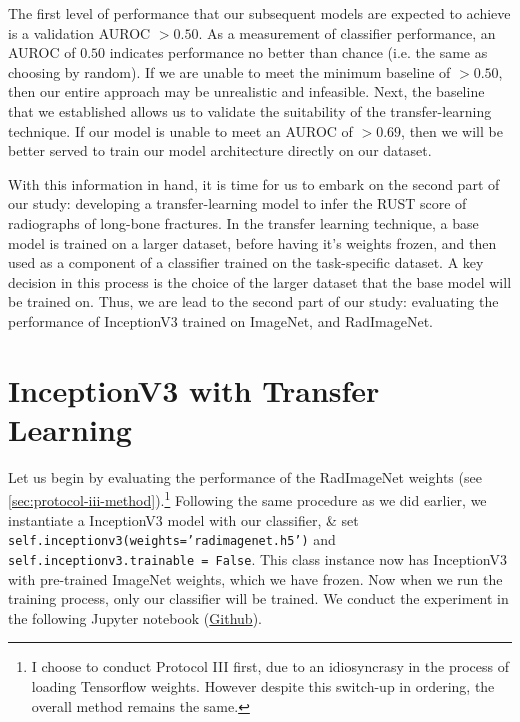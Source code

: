 \noindent
The first level of performance that our subsequent models are expected to achieve is a validation AUROC \(> 0.50\). As a measurement of classifier performance, an AUROC of \(0.50\) indicates performance no better than chance (i.e. the same as choosing by random). If we are unable to meet the minimum baseline of \(> 0.50\), then our entire approach may be unrealistic and infeasible. 
Next, the baseline that we established allows us to validate the suitability of the transfer-learning technique. If our model is unable to meet an AUROC of \(> 0.69\), then we will be better served to train our model architecture directly on our dataset.

With this information in hand, it is time for us to embark on the second part of our study: developing a transfer-learning model to infer the RUST score of radiographs of long-bone fractures. In the transfer learning technique, a base model is trained on a larger dataset, before having it's weights frozen, and then used as a component of a classifier trained on the task-specific dataset. A key decision in this process is the choice of the larger dataset that the base model will be trained on. Thus, we are lead to the second part of our study: evaluating the performance of InceptionV3 trained on ImageNet, and RadImageNet.

\section{InceptionV3 with Transfer Learning}

Let us begin by evaluating the performance of the RadImageNet weights (see \autoref{sec:protocol-iii-method}).\footnote{I choose to conduct Protocol III first, due to an idiosyncrasy in the process of loading Tensorflow weights. However despite this switch-up in ordering, the overall method remains the same.} Following the same procedure as we did earlier, we instantiate a InceptionV3 model with our classifier, \& set \texttt{self.inceptionv3(weights='radimagenet.h5')} and \texttt{self.inceptionv3.trainable = False}. This class instance now has InceptionV3 with pre-trained ImageNet weights, which we have frozen. Now when we run the training process, only our classifier will be trained. We conduct the experiment in the following Jupyter notebook (\href{https://github.com/ShenZhouHong/radiography-ai-project/blob/8d295305fbf9e8a7d1993e4564731e3f3f113f2d/python/initial-evaluation/inceptionv3-radimgnet.ipynb}{Github}).


